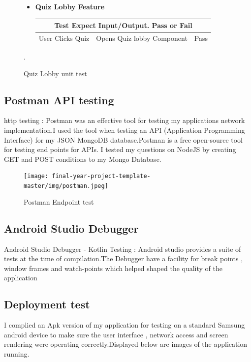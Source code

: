 \begin{figure}[H]
\begin{itemize}
\item    \textbf{Quiz Lobby Feature}  

\begin{tabular}{ |p{3.5cm}||p{3.5cm}|p{3.5cm}|  }
 \hline
 \multicolumn{3}{|c|}{Test Expect Input/Output.  Pass or Fail } \\
 \hline
 User Clicks Quiz   & Opens Quiz lobby Component   & Pass\\
 \hline
\end{tabular}

\end{itemize}. 

\caption{Quiz Lobby unit test}

\end{figure}


    
    
    
\subsection{Postman API testing}
 http testing  : Postman was an  effective  tool for testing my applications network implementation.I used the tool when testing  an API (Application Programming Interface)  for my JSON MongoDB database.Postman is a free open-source  tool for testing end points for APIs.
 I tested my questions on NodeJS by creating GET and POST conditions to my Mongo Database.
 
 
  \begin{figure}[H]
  \centering
    \texttt{[image: final-year-project-template-master/img/postman.jpeg]}
     \caption{Postman Endpoint test}
\end{figure}


 \subsection{Android Studio  Debugger}


Android Studio  Debugger - Kotlin Testing  : Android studio provides  a suite of tests at the time of compilation.The Debugger have a facility for  break points ,  window frames and watch-points which  helped shaped the quality of the application


 \subsection{Deployment test}
 I complied an Apk version of my application for testing on a standard Samsung android device to make sure the user interface , network access and screen rendering were operating correctly.Displayed below are images of the  application running.
 


